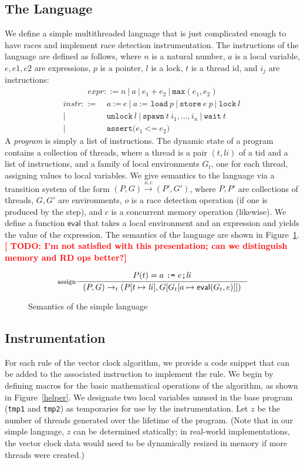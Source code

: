 \documentclass[preprint, 10pt]{sigplanconf}
\newcommand{\TODO}[1]{\textbf{\textcolor{red}{[ TODO: #1]}}}
\newcommand{\assign}[2]{#1\ \texttt{:=}\ #2}
\newcommand{\load}[2]{#1\ \texttt{:= load}\ #2}
\newcommand{\store}[2]{\texttt{store}\ #2\ #1}
\newcommand{\lock}[1]{\texttt{lock}\ #1}
\newcommand{\unlock}[1]{\texttt{unlock}\ #1}
\newcommand{\spawn}[2]{\texttt{spawn}\ #1\ #2}
\newcommand{\wait}[1]{\texttt{wait}\ #1}
\newcommand{\assert}[2]{\texttt{assert(}#1\ \texttt{<=}\ #2\texttt{)}}
\begin{document}
\subsection{The Language}
We define a simple multithreaded language that is just complicated enough to have races and implement race detection instrumentation. The instructions of the language are defined as follows, where $n$ is a natural number, $a$ is a local variable, $e, e1, e2$ are expressions, $p$ is a pointer, $l$ is a lock, $t$ is a thread id, and $i_j$ are instructions:
\begin{align*}\mathit{expr} ::= n~|~a~|~e_1 + e_2~|~\mathtt{max}(e_1, e_2)\end{align*}
\begin{align*}\mathit{instr} ::=\ &\assign{a}{e}~|~\load{a}{p}~|~\store{p}{e}~|~\lock{l}~\\|~&\unlock{l}~|~\spawn{t}{i_1, ..., i_n}~|~\wait{t}~\\|~&\assert{e_1}{e_2}\end{align*}
A \emph{program} is simply a list of instructions. The dynamic state of a program contains a collection of threads, where a thread is a pair $(t, \mathit{li})$ of a tid and a list of instructions, and a family of local environments $G_t$, one for each thread, assigning values to local variables. We give semantics to the language via a transition system of the form $(P, G) \xrightarrow{o, c} (P', G')$, where $P, P'$ are collections of threads, $G, G'$ are environments, $o$ is a race detection operation (if one is produced by the step), and $c$ is a concurrent memory operation (likewise). We define a function $\mathsf{eval}$ that takes a local environment and an expression and yields the value of the expression. The semantics of the language are shown in Figure~\ref{semantics}. \TODO{I'm not satisfied with this presentation; can we distinguish memory and RD ops better?}

\begin{figure}[htb]
$$\inference[assign]{P(t) = \assign{a}{e}\texttt{;} \mathit{li}}{(P, G) \rightarrow_t \\(P[t \mapsto \mathit{li}], G[G_t[a \mapsto \mathsf{eval}(G_t, e)]])}$$

\caption{Semantics of the simple language}
\label{semantics}
\end{figure}


\subsection{Instrumentation}
For each rule of the vector clock algorithm, we provide a code snippet that can be added to the associated instruction to implement the rule. We begin by defining macros for the basic mathematical operations of the algorithm, as shown in Figure~\ref{helper}. We designate two local variables unused in the base program (\texttt{tmp1} and \texttt{tmp2}) as temporaries for use by the instrumentation. Let $z$ be the number of threads generated over the lifetime of the program. (Note that in our simple language, $z$ can be determined statically; in real-world implementations, the vector clock data would need to be dynamically resized in memory if more threads were created.)
\end{document}

